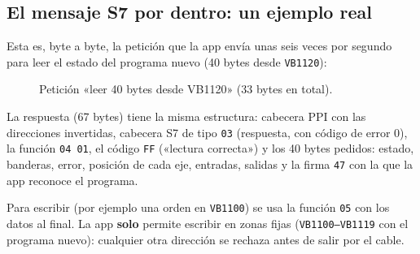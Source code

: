 \documentclass[a4paper,11pt]{article}
\newcommand{\codigo}[1]{\texttt{#1}}
\begin{document}
\subsection{El mensaje S7 por dentro: un ejemplo real}
Esta es, byte a byte, la petición que la app envía unas seis veces por segundo para leer el estado del programa nuevo (40 bytes desde \codigo{VB1120}):

\begin{figure}[H]
\centering
{}
\caption{Petición «leer 40 bytes desde VB1120» (33 bytes en total).}
\end{figure}

La respuesta (67 bytes) tiene la misma estructura: cabecera PPI con las direcciones invertidas, cabecera S7 de tipo \codigo{03} (respuesta, con código de error 0), la función \codigo{04 01}, el código \codigo{FF} («lectura correcta») y los 40 bytes pedidos: estado, banderas, error, posición de cada eje, entradas, salidas y la firma \codigo{47} con la que la app reconoce el programa.

Para escribir (por ejemplo una orden en \codigo{VB1100}) se usa la función \codigo{05} con los datos al final. La app \textbf{solo} permite escribir en zonas fijas (\codigo{VB1100--VB1119} con el programa nuevo): cualquier otra dirección se rechaza antes de salir por el cable.
\end{document}

